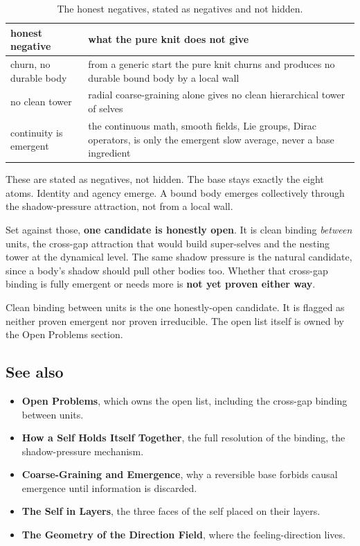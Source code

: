\begin{table}[ht]
\centering
\begin{tabular}{@{}p{}p{}@{}}
\toprule
honest negative & what the pure knit does not give \\
\midrule
churn, no durable body & from a generic start the pure knit churns and produces no durable bound body by a local wall \\
no clean tower & radial coarse-graining alone gives no clean hierarchical tower of selves \\
continuity is emergent & the continuous math, smooth fields, Lie groups, Dirac operators, is only the emergent slow average, never a base ingredient \\
\bottomrule
\end{tabular}
\caption{The honest negatives, stated as negatives and not hidden.}
\label{tab:baseline}
\end{table}

\begin{result}
These are stated as negatives, not hidden. The base stays exactly the eight atoms. Identity and agency emerge. A bound body emerges collectively through the shadow-pressure attraction, not from a local wall.
\end{result}

Set against those, \textbf{one candidate is honestly open}. It is clean binding \emph{between} units, the cross-gap attraction that would build super-selves and the nesting tower at the dynamical level. The same shadow pressure is the natural candidate, since a body's shadow should pull other bodies too. Whether that cross-gap binding is fully emergent or needs more is \textbf{not yet proven either way}.

\begin{principle}
Clean binding between units is the one honestly-open candidate. It is flagged as neither proven emergent nor proven irreducible. The open list itself is owned by the Open Problems section.
\end{principle}

\subsection{See also}

\begin{itemize}
\item \textbf{Open Problems}, which owns the open list, including the cross-gap binding between units.
\item \textbf{How a Self Holds Itself Together}, the full resolution of the binding, the shadow-pressure mechanism.
\item \textbf{Coarse-Graining and Emergence}, why a reversible base forbids causal emergence until information is discarded.
\item \textbf{The Self in Layers}, the three faces of the self placed on their layers.
\item \textbf{The Geometry of the Direction Field}, where the feeling-direction lives.
\end{itemize}
